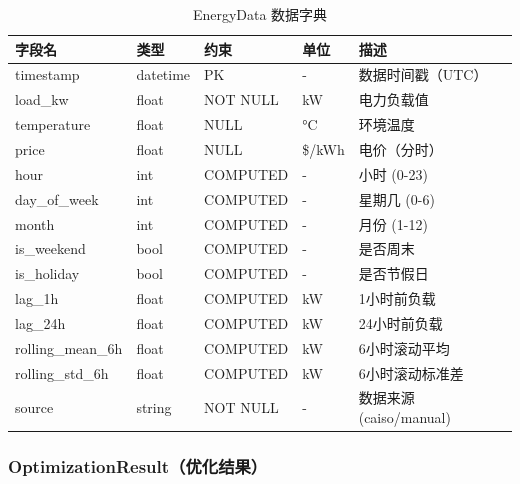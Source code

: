 \begin{table}[htbp]
    \centering
    \caption{EnergyData 数据字典}
    \label{tab:dd-energy}
    \begin{tabularx}{\textwidth}{@{}l l l l X@{}}
        \toprule
        \textbf{字段名}      & \textbf{类型} & \textbf{约束} & \textbf{单位} & \textbf{描述}         \\
        \midrule
        timestamp         & datetime    & PK          & -           & 数据时间戳（UTC）          \\
        load\_kw          & float       & NOT NULL    & kW          & 电力负载值               \\
        temperature       & float       & NULL        & °C          & 环境温度                \\
        price             & float       & NULL        & \$/kWh      & 电价（分时）              \\
        hour              & int         & COMPUTED    & -           & 小时 (0-23)           \\
        day\_of\_week     & int         & COMPUTED    & -           & 星期几 (0-6)           \\
        month             & int         & COMPUTED    & -           & 月份 (1-12)           \\
        is\_weekend       & bool        & COMPUTED    & -           & 是否周末                \\
        is\_holiday       & bool        & COMPUTED    & -           & 是否节假日               \\
        lag\_1h           & float       & COMPUTED    & kW          & 1小时前负载              \\
        lag\_24h          & float       & COMPUTED    & kW          & 24小时前负载             \\
        rolling\_mean\_6h & float       & COMPUTED    & kW          & 6小时滚动平均             \\
        rolling\_std\_6h  & float       & COMPUTED    & kW          & 6小时滚动标准差            \\
        source            & string      & NOT NULL    & -           & 数据来源 (caiso/manual) \\
        \bottomrule
    \end{tabularx}
\end{table}

\subsubsection{OptimizationResult（优化结果）}

